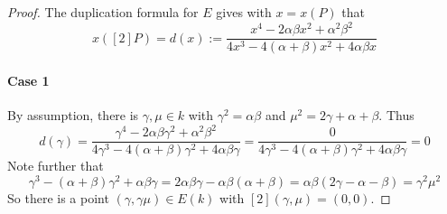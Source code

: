 \documentclass{scrartcl}
\theoremstyle{definition}
\begin{document}
\begin{proof}
    The duplication formula for $E$ gives with $x = x(P)$ that
    \begin{equation*}
        x([2]P) = d(x) := \frac {x^4 - 2 \alpha \beta x^2 + \alpha^2 \beta^2} {4x^3 - 4(\alpha + \beta) x^2 + 4 \alpha \beta x}
    \end{equation*}

    \paragraph{Case 1} By assumption, there is $\gamma, \mu \in k$ with $\gamma^2 = \alpha\beta$ and $\mu^2 = 2\gamma + \alpha + \beta$.
    Thus
    \begin{equation*}
        d(\gamma) = \frac {\gamma^4 - 2\alpha\beta\gamma^2 + \alpha^2\beta^2} {4\gamma^3 - 4(\alpha + \beta) \gamma^2 + 4 \alpha \beta \gamma} = \frac 0 {4\gamma^3 - 4(\alpha + \beta) \gamma^2 + 4 \alpha \beta \gamma} = 0
    \end{equation*}
    Note further that
    \begin{equation*}
        \gamma^3 - (\alpha + \beta)\gamma^2 + \alpha\beta\gamma = 2\alpha\beta\gamma - \alpha\beta(\alpha + \beta) = \alpha\beta(2\gamma - \alpha - \beta) = \gamma^2 \mu^2
    \end{equation*}
    So there is a point $(\gamma, \gamma\mu) \in E(k)$ with $[2](\gamma, \mu) = (0, 0)$.


\end{proof}
\end{document}
